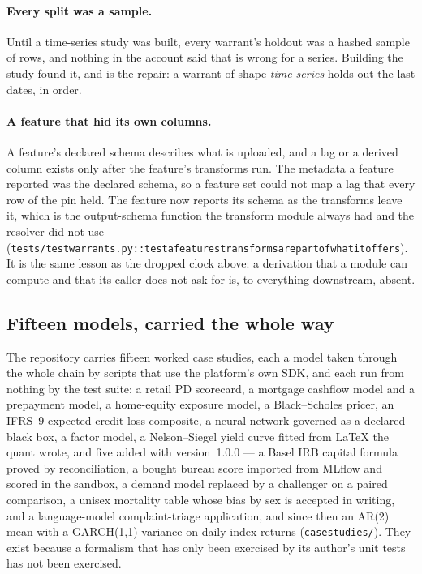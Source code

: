 \documentclass[11pt,a4paper]{article}
\renewcommand{\_}{\oldunderscore\allowbreak}
\theoremstyle{plain}
\theoremstyle{definition}
\theoremstyle{definition}
\theoremstyle{remark}
\begin{document}
\paragraph{Every split was a sample.} Until a time-series study was built, every warrant's holdout was a hashed
sample of rows, and nothing in the account said that is wrong for a series. Building the study found it, and
 is the repair: a warrant of shape \emph{time series} holds out the last dates, in order.

\paragraph{A feature that hid its own columns.} A feature's declared schema describes what is uploaded, and a
lag or a derived column exists only after the feature's transforms run. The metadata a feature reported was the
declared schema, so a feature set could not map a lag that every row of the pin held. The feature now reports its
schema as the transforms leave it, which is the output-schema function the transform module always had and the
resolver did not use
(\texttt{tests/test\_warrants.py::test\_a\_features\_transforms\_are\_part\_of\_what\_it\_offers}). It is the
same lesson as the dropped clock above: a derivation that a module can compute and that its caller does not ask
for is, to everything downstream, absent.

\subsection{Fifteen models, carried the whole way}

The repository carries fifteen worked case studies, each a model taken through the whole chain by scripts
that use the platform's own SDK, and each run from nothing by the test suite: a retail PD scorecard, a
mortgage cashflow model and a prepayment model, a home-equity exposure model, a Black--Scholes pricer, an
IFRS~9 expected-credit-loss composite, a neural network governed as a declared black box, a factor model, a
Nelson--Siegel yield curve fitted from LaTeX the quant wrote, and five added with version~1.0.0 --- a Basel
IRB capital formula proved by reconciliation, a bought bureau score imported from MLflow and scored in the
sandbox, a demand model replaced by a challenger on a paired comparison, a unisex mortality table whose
bias by sex is accepted in writing, and a language-model complaint-triage application, and since then an AR(2) mean with a GARCH(1,1) variance on
daily index returns (\texttt{case\_studies/}). They exist because a formalism that has only been exercised by its author's unit
tests has not been exercised.
\end{document}
